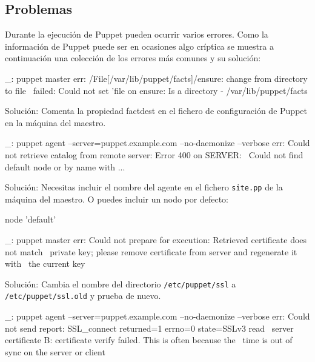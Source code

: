\subsection{Problemas}

Durante la ejecución de Puppet pueden ocurrir varios errores. Como la información de Puppet puede ser en ocasiones algo críptica se muestra a continuación una colección de los errores más comunes y su solución:

\begin{bashcode}
_: puppet master
err: /File[/var/lib/puppet/facts]/ensure: change from directory to file \
failed: Could not set 'file on ensure: Is a directory - /var/lib/puppet/facts
\end{bashcode}

Solución: Comenta la propiedad factdest en el fichero de configuración de Puppet en la máquina del maestro.

\begin{bashcode}
_: puppet agent --server=puppet.example.com --no-daemonize --verbose
err: Could not retrieve catalog from remote server: Error 400 on SERVER: \
Could not find default node or by name with ...
\end{bashcode}

Solución: Necesitas incluir el nombre del agente en el fichero \texttt{site.pp} de la máquina del maestro. O puedes incluir un nodo por defecto:

\begin{rubycode}
node 'default' {
}
\end{rubycode}

\begin{bashcode}
_: puppet master
err: Could not prepare for execution: Retrieved certificate does not match \
private key; please remove certificate from server and regenerate it with \
the current key
\end{bashcode}

Solución: Cambia el nombre del directorio \texttt{/etc/puppet/ssl} a \texttt{/etc/puppet/ssl.old} y prueba de nuevo.

\begin{bashcode}
_: puppet agent --server=puppet.example.com --no-daemonize --verbose
err: Could not send report: SSL_connect returned=1 errno=0 state=SSLv3 read \
server certificate B: certificate verify failed. This is often because the \
time is out of sync on the server or client
\end{bashcode}

